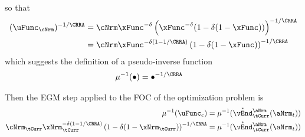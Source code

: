 \documentclass[./SolvingMicroDSOPs]{subfiles}
\begin{document}
{{\begin{align}
      \end{align}
      so that
      \begin{align}
        (\uFunc_{\cNrm})^{-1/\CRRA} & = \cNrm \xFunc^{-\wealthU} \left(\xFunc^{-\wealthU}(1-\wealthU(1-\xFunc))\right)^{-1/\CRRA}\\
                                    & = \cNrm \xFunc^{-\wealthU(1-1/\CRRA)} \left(1-\wealthU(1-\xFunc)\right)^{-1/\CRRA} \notag
      \end{align}
      which suggests the definition of a pseudo-inverse function
      \begin{align}
                                  \muInv(\bullet) & = \bullet^{-1/\CRRA}                              
      \end{align}

      Then the EGM step applied to the FOC of the optimization problem is 
      \begin{align}
        \muInv(\uFunc_{c}) & = \muInv(\Maxed{\vEnd}^{\aNrm}_{\tCurr}(\aNrm_{t}))
        \\ \cNrm_{\tCurr} \xNrm_{\tCurr}^{-\wealthU(1-1/\CRRA)} \left(1-\wealthU(1-\xNrm_{\tCurr})\right)^{-1/\CRRA} & = \muInv(\Maxed{\vEnd}^{\aNrm}_{\tCurr}(\aNrm_{t})) \notag
      \end{align}

}}
\end{document}
